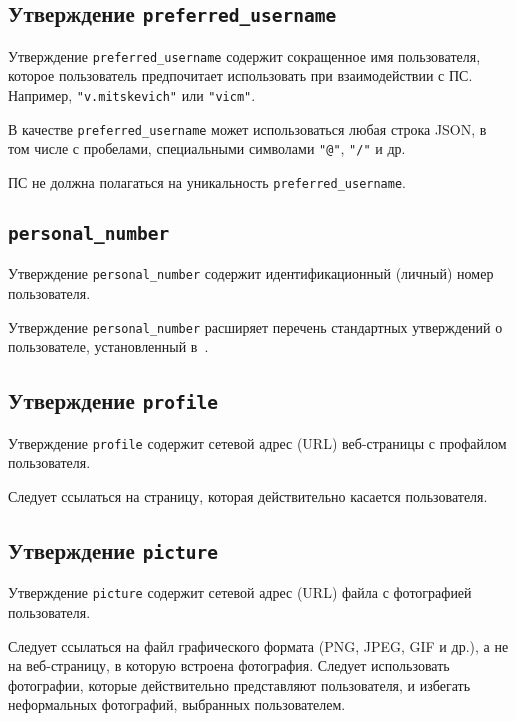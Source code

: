 \subsection{Утверждение \lstinline{preferred_username}}
\label{CLAIMS.PreferredUsername} 

Утверждение \lstinline{preferred_username} содержит сокращенное имя 
пользователя, которое пользователь предпочитает использовать при взаимодействии 
с ПС. Например, \lstinline{"v.mitskevich"} или \lstinline{"vicm"}.

В качестве \lstinline{preferred_username} может использоваться любая 
строка JSON, в том числе с пробелами, специальными символами 
\lstinline{"@"}, \lstinline{"/"} и др.

ПС не должна полагаться на уникальность \lstinline{preferred_username}.

\subsection{ 
\lstinline{personal_number}}\label{CLAIMS.PersonalNumber} 

Утверждение \lstinline{personal_number} содержит идентификационный (личный) 
номер пользователя. 

\begin{note*}
Утверждение \lstinline{personal_number} расширяет перечень стандартных утверждений
о пользователе, установленный в~\cite{OIDC}.
\end{note*}

\subsection{Утверждение \lstinline{profile}}\label{CLAIMS.Profile}

Утверждение \lstinline{profile} содержит сетевой адрес (URL) веб-страницы
с профайлом пользователя. 

Следует ссылаться на страницу, которая действительно касается пользователя.

\subsection{Утверждение \lstinline{picture}}\label{CLAIMS.Picture}

Утверждение \lstinline{picture} содержит сетевой адрес (URL) файла с
фотографией пользователя.

Следует ссылаться на файл графического формата (PNG, JPEG, GIF и др.),
а не на веб-страницу, в которую встроена фотография.
%
Следует использовать фотографии, которые действительно представляют 
пользователя, и избегать неформальных фотографий, выбранных пользователем.

